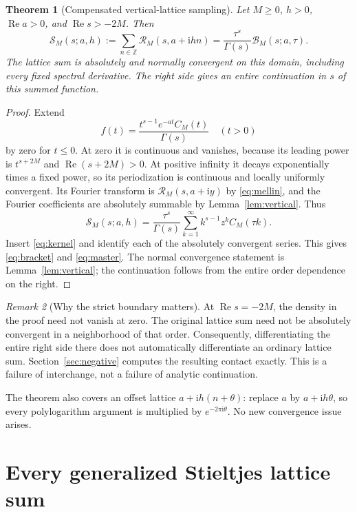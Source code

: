 \documentclass[11pt,a4paper]{article}
\numberwithin{equation}{section}
\newtheorem{theorem}{Theorem}[section]
\theoremstyle{definition}
\theoremstyle{remark}
\newtheorem{remark}[theorem]{Remark}
\DeclareMathOperator{\Ree}{Re}
\newcommand{\ii}{\mathrm i}
\newcommand{\Z}{\mathbb Z}
\newcommand{\Rcal}{\mathcal R}
\newcommand{\Bcal}{\mathcal B}
\newcommand{\Scal}{\mathcal S}
\begin{document}
\begin{theorem}[Compensated vertical-lattice sampling]
\label{thm:sampling}
Let $M\ge0$, $h>0$, $\Ree a>0$, and $\Ree s>-2M$. Then
\begin{equation}\label{eq:master}
 \boxed{\displaystyle
 \Scal_M(s;a,h):=\sum_{n\in\Z}\Rcal_M(s,a+\ii hn)
       =\frac{\tau^s}{\Gamma(s)}\Bcal_M(s;a,\tau).}
\end{equation}
The lattice sum is absolutely and normally convergent on this domain,
including every fixed spectral derivative. The right side gives an
entire continuation in $s$ of this summed function.
\end{theorem}
\begin{proof}
Extend
\[
 f(t)=\frac{t^{s-1}e^{-at}C_M(t)}{\Gamma(s)}\quad(t>0)
\]
by zero for $t\le0$. At zero it is continuous and vanishes, because
its leading power is $t^{s+2M}$ and $\Ree(s+2M)>0$.
At positive infinity it decays exponentially times a fixed power,
so its periodization is continuous and locally uniformly convergent.
Its Fourier transform is $\Rcal_M(s,a+\ii y)$ by
\eqref{eq:mellin}, and the Fourier coefficients are absolutely
summable by Lemma~\ref{lem:vertical}. Thus
\[
 \Scal_M(s;a,h)=\frac{\tau^s}{\Gamma(s)}
       \sum_{k=1}^\infty k^{s-1}z^k C_M(\tau k).
\]
Insert \eqref{eq:kernel} and identify each of the absolutely
convergent series. This gives \eqref{eq:bracket} and
\eqref{eq:master}. The normal convergence statement is
Lemma~\ref{lem:vertical}; the continuation follows from the
entire order dependence on the right.
\end{proof}

\begin{remark}[Why the strict boundary matters]\label{rem:boundary}
At $\Ree s=-2M$, the density in the proof need not vanish at zero.
The original lattice sum need not be absolutely convergent in a
neighborhood of that order. Consequently, differentiating the entire
right side there does not automatically differentiate an ordinary
lattice sum. Section~\ref{sec:negative} computes the resulting contact
exactly. This is a failure of interchange, not a failure of analytic
continuation.
\end{remark}

The theorem also covers an offset lattice $a+\ii h(n+\theta)$:
replace $a$ by $a+\ii h\theta$, so every polylogarithm argument is
multiplied by $e^{-2\pi\ii\theta}$. No new convergence issue arises.

\section{Every generalized Stieltjes lattice sum}
\label{sec:stieltjes}
\end{document}
